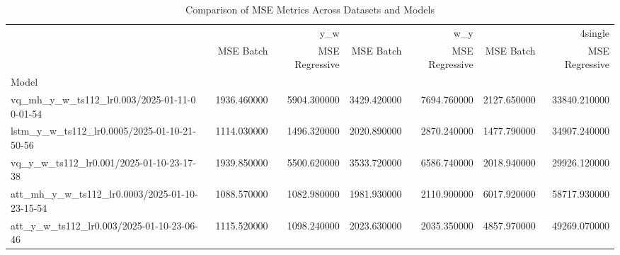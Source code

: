 \begin{table}
\caption{Comparison of MSE Metrics Across Datasets and Models}
\label{tab:mse_comparison}
\begin{tabular}{lrrrrrr}
\toprule
 & \multicolumn{2}{r}{y_w} & \multicolumn{2}{r}{w_y} & \multicolumn{2}{r}{4single} \\
 & MSE Batch & MSE Regressive & MSE Batch & MSE Regressive & MSE Batch & MSE Regressive \\
Model &  &  &  &  &  &  \\
\midrule
vq_mh_y_w_ts112_lr0.003/2025-01-11-0 0-01-54 & 1936.460000 & 5904.300000 & 3429.420000 & 7694.760000 & 2127.650000 & 33840.210000 \\
lstm_y_w_ts112_lr0.0005/2025-01-10-21-50-56 & 1114.030000 & 1496.320000 & 2020.890000 & 2870.240000 & 1477.790000 & 34907.240000 \\
vq_y_w_ts112_lr0.001/2025-01-10-23-17-38 & 1939.850000 & 5500.620000 & 3533.720000 & 6586.740000 & 2018.940000 & 29926.120000 \\
att_mh_y_w_ts112_lr0.0003/2025-01-10-23-15-54 & 1088.570000 & 1082.980000 & 1981.930000 & 2110.900000 & 6017.920000 & 58717.930000 \\
att_y_w_ts112_lr0.003/2025-01-10-23-06-46 & 1115.520000 & 1098.240000 & 2023.630000 & 2035.350000 & 4857.970000 & 49269.070000 \\
\bottomrule
\end{tabular}
\end{table}
